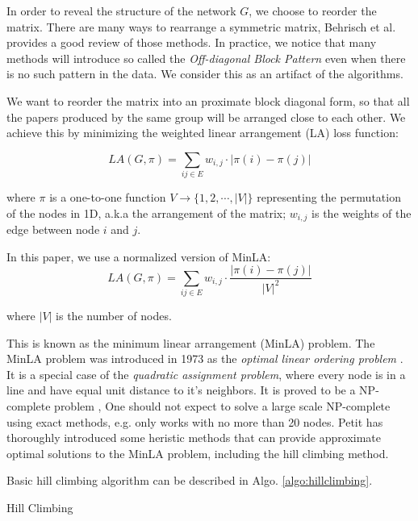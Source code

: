 In order to reveal the structure of the network $G$, we choose to reorder the matrix.
There are many ways to rearrange a symmetric matrix, Behrisch et al. \cite{behrisch_matrix_2016} provides a good review of those methods.
In practice, we notice that many methods will introduce so called the \emph{Off-diagonal Block Pattern} even when there is no such pattern in the data.
We consider this as an artifact of the algorithms.

We want to reorder the matrix into an proximate block diagonal form, so that all the papers produced by the same group will be arranged close to each other.
We achieve this by minimizing the weighted linear arrangement (LA) loss function:

\begin{equation}
    LA(G, \pi) = \sum_{ij \in E} w_{i,j} \cdot |\pi(i) - \pi(j)|
\end{equation}

where $\pi$ is a one-to-one function $V \rightarrow \{1,2,\cdots,|V|\}$ representing the permutation of the nodes in 1D, a.k.a the arrangement of the matrix;
$w_{i,j}$ is the weights of the edge between node $i$ and $j$.

In this paper, we use a normalized version of MinLA:
\begin{equation}
    LA(G, \pi) = \sum_{ij \in E} w_{i,j} \cdot \frac{|\pi(i) - \pi(j)|}{|V|^2}
\end{equation}

where $|V|$ is the number of nodes.

This is known as the minimum linear arrangement (MinLA) problem.
The MinLA problem was introduced in 1973 as the \emph{optimal linear ordering problem} \cite{adolphson_optimal_1973}.
It is a special case of the \emph{quadratic assignment problem}, where every node is in a line and have equal unit distance to it's neighbors.
It is proved to be a NP-complete problem \cite{garey_simplified_1976},
One should not expect to solve a large scale NP-complete using exact methods, 
e.g. \cite{andrade_minimum_2017} only works with no more than 20 nodes.
Petit \cite{petit_experiments_2004} has thoroughly introduced some heristic methods that can provide approximate optimal solutions to the MinLA problem, 
including the hill climbing method.

Basic hill climbing algorithm can be described in Algo. \ref{algo:hillclimbing}. 

\begin{algorithm}
    \caption{Hill Climbing}\label{algo:hillclimbing}
\end{algorithm}

